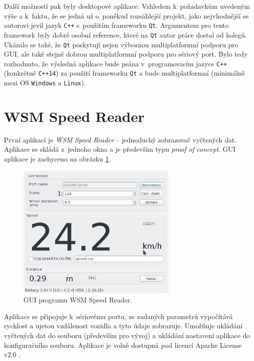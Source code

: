 Další možností pak byly desktopové aplikace. Vzhledem k~požadavkům uvedeným
výše a k~faktu, že se jedná už o~poněkud rozsáhlejší projekt, jako nejvhodnější
se autorovi jevil jazyk \texttt{C++} s~použitím frameworku \texttt{Qt}.
Argumentem pro tento framework byly dobré osobní reference, které na
\texttt{Qt} autor práce dostal od kolegů. Ukázalo se také, že \texttt{Qt} poskytují
nejen výbornou multiplatformní podporu pro GUI, ale také stejně dobrou
multiplatformní podporu pro sériový port. Bylo tedy rozhodnuto, že výsledná
aplikace bude psána v~programovacím jazyce \texttt{C++} (konkrétně
\texttt{C++14}) za použití frameworku \texttt{Qt} a bude multiplatformní
(minimálně mezi OS \texttt{Windows} a \texttt{Linux}).

\section{WSM Speed Reader}
\label{sec:sw-wsm-speed-reader}

První aplikací je \textit{WSM Speed Reader} -- jednoduchý zobrazovač vyčtených
dat. Aplikace se skládá z~jednoho okna a je především typu
\textit{proof of concept}. GUI aplikace je zachyceno na obrázku
\ref{fig:wsm-speed-reader-gui}.

\begin{figure}[h]
\includegraphics[width=0.7\textwidth]{data/speed_reader_screenshot.png}
\caption{GUI programu WSM Speed Reader.}
\label{fig:wsm-speed-reader-gui}
\end{figure}

Aplikace se připojuje k~sériovému portu, ze zadaných parametrů vypočítává
rychlost a ujetou vzdálenost vozidla a tyto údaje zobrazuje. Umožňuje ukládání
vyčtených dat do souboru (především pro vývoj) a ukládání nastavení aplikace
do konfiguračního souboru. Aplikace je volně dostupná pod licencí Apache
License v2.0 \cite{wsm-speed-reader}.

